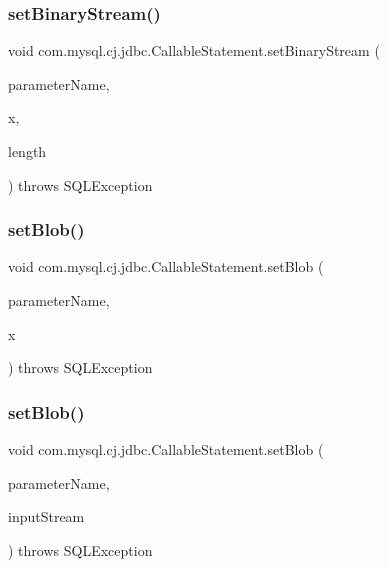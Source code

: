 \subsubsection{\texorpdfstring{set\+Binary\+Stream()}{setBinaryStream()}\hspace{0.1cm}{\footnotesize\ttfamily [3/3]}}
{\footnotesize\ttfamily void com.\+mysql.\+cj.\+jdbc.\+Callable\+Statement.\+set\+Binary\+Stream (\begin{DoxyParamCaption}\item[{String}]{parameter\+Name,  }\item[{Input\+Stream}]{x,  }\item[{long}]{length }\end{DoxyParamCaption}) throws S\+Q\+L\+Exception}

\mbox{\label{classcom_1_1mysql_1_1cj_1_1jdbc_1_1_callable_statement_ae0e2596de05204678b8caa247366b7f8}} 
\subsubsection{\texorpdfstring{set\+Blob()}{setBlob()}\hspace{0.1cm}{\footnotesize\ttfamily [1/3]}}
{\footnotesize\ttfamily void com.\+mysql.\+cj.\+jdbc.\+Callable\+Statement.\+set\+Blob (\begin{DoxyParamCaption}\item[{String}]{parameter\+Name,  }\item[{\mbox{\hyperlink{classcom_1_1mysql_1_1cj_1_1jdbc_1_1_blob}{Blob}}}]{x }\end{DoxyParamCaption}) throws S\+Q\+L\+Exception}

\mbox{\label{classcom_1_1mysql_1_1cj_1_1jdbc_1_1_callable_statement_a862ed16900aced622be6e676349d85c2}} 
\subsubsection{\texorpdfstring{set\+Blob()}{setBlob()}\hspace{0.1cm}{\footnotesize\ttfamily [2/3]}}
{\footnotesize\ttfamily void com.\+mysql.\+cj.\+jdbc.\+Callable\+Statement.\+set\+Blob (\begin{DoxyParamCaption}\item[{String}]{parameter\+Name,  }\item[{Input\+Stream}]{input\+Stream }\end{DoxyParamCaption}) throws S\+Q\+L\+Exception}

